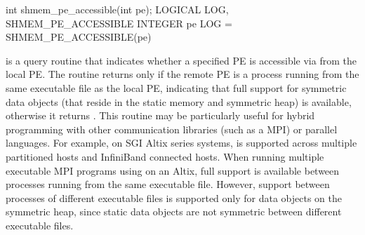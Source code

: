 \synC     
int shmem_pe_accessible(int pe); %
\synF
LOGICAL LOG, SHMEM_PE_ACCESSIBLE
INTEGER pe
LOG = SHMEM_PE_ACCESSIBLE(pe) %

{
        is  a  query routine  that indicates  whether  a
       specified \ac{PE} is accessible via \openshmem from the local \ac{PE}. The  routine returns  only if  the  remote  \ac{PE} is a process  running from the same executable  file as the local \ac{PE}, indicating that full \openshmem support for symmetric data objects (that reside in the static memory and symmetric heap) is available, otherwise it returns .  This routine may be particularly useful for hybrid programming with other communication libraries (such as a \ac{MPI}) or parallel languages.  For example, on  SGI Altix  series  systems, \openshmem is  supported  across multiple partitioned hosts and InfiniBand connected hosts. When running multiple executable MPI programs using \openshmem on an Altix, full \openshmem support is available between processes running from the same executable file. However, \openshmem support between processes of different executable  files  is  supported only for data objects on the symmetric heap, since static data objects are  not symmetric  between  different executable  files.        
}
{
}

\eAPI
